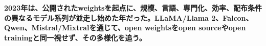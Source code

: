 \noindent\textbf{2023年は、公開されたweightsを起点に、規模、言語、専門化、効率、配布条件の異なるモデル系列が並走し始めた年だった。LLaMA/Llama 2、Falcon、Qwen、Mistral/Mixtralを通じて、open weightsをopen sourceやopen trainingと同一視せず、その多様化を追う。}\autocite{src-00c370ab2324,src-1fd43f93adcc,src-240ca564b6b8,src-3db09fede330,src-5c8e2db8871a,src-74aa7e2a7ca4,src-81f670ec1e74,src-8bdb904686fb,src-9df482e2c96c,src-b7e5243e6d59,src-bc7aba201f01,src-d4b6359bbad1,src-dd2cfa98160d,src-f0349196879e}
